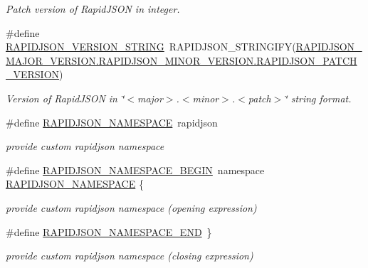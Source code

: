 \begin{DoxyCompactItemize}
\begin{DoxyCompactList}\small\item\em Patch version of Rapid\+J\+S\+ON in integer. \end{DoxyCompactList}\item 
\mbox{\label{group__RAPIDJSON__CONFIG_gad283cfde97d9a32b7d8e8107b11f70a6}} 
\#define \hyperlink{group__RAPIDJSON__CONFIG_gad283cfde97d9a32b7d8e8107b11f70a6}{R\+A\+P\+I\+D\+J\+S\+O\+N\+\_\+\+V\+E\+R\+S\+I\+O\+N\+\_\+\+S\+T\+R\+I\+NG}~R\+A\+P\+I\+D\+J\+S\+O\+N\+\_\+\+S\+T\+R\+I\+N\+G\+I\+FY(\hyperlink{group__RAPIDJSON__CONFIG_gaf967d31be43666ce7f53756d73bd1cdf}{R\+A\+P\+I\+D\+J\+S\+O\+N\+\_\+\+M\+A\+J\+O\+R\+\_\+\+V\+E\+R\+S\+I\+O\+N.\+R\+A\+P\+I\+D\+J\+S\+O\+N\+\_\+\+M\+I\+N\+O\+R\+\_\+\+V\+E\+R\+S\+I\+O\+N.\+R\+A\+P\+I\+D\+J\+S\+O\+N\+\_\+\+P\+A\+T\+C\+H\+\_\+\+V\+E\+R\+S\+I\+ON})
\begin{DoxyCompactList}\small\item\em Version of Rapid\+J\+S\+ON in \char`\"{}$<$major$>$.$<$minor$>$.$<$patch$>$\char`\"{} string format. \end{DoxyCompactList}\item 
\#define \hyperlink{group__RAPIDJSON__CONFIG_ga743a79d3af927391fe3eb5c979136899}{R\+A\+P\+I\+D\+J\+S\+O\+N\+\_\+\+N\+A\+M\+E\+S\+P\+A\+CE}~rapidjson
\begin{DoxyCompactList}\small\item\em provide custom rapidjson namespace \end{DoxyCompactList}\item 
\#define \hyperlink{group__RAPIDJSON__CONFIG_gad3806c8251fdc7da9618b7e922674ffc}{R\+A\+P\+I\+D\+J\+S\+O\+N\+\_\+\+N\+A\+M\+E\+S\+P\+A\+C\+E\+\_\+\+B\+E\+G\+IN}~namespace \hyperlink{group__RAPIDJSON__CONFIG_ga743a79d3af927391fe3eb5c979136899}{R\+A\+P\+I\+D\+J\+S\+O\+N\+\_\+\+N\+A\+M\+E\+S\+P\+A\+CE} \{
\begin{DoxyCompactList}\small\item\em provide custom rapidjson namespace (opening expression) \end{DoxyCompactList}\item 
\#define \hyperlink{group__RAPIDJSON__CONFIG_gaf18f052a98b9f5df5448d39484b743c1}{R\+A\+P\+I\+D\+J\+S\+O\+N\+\_\+\+N\+A\+M\+E\+S\+P\+A\+C\+E\+\_\+\+E\+ND}~\}
\begin{DoxyCompactList}\small\item\em provide custom rapidjson namespace (closing expression) \end{DoxyCompactList}\item 

\end{DoxyCompactItemize}
